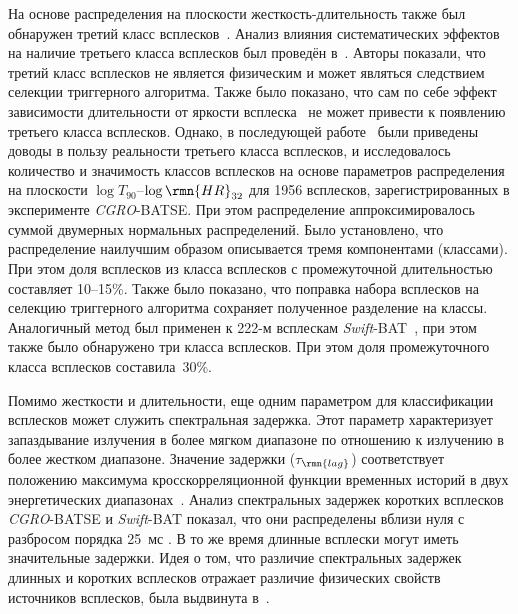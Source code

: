 На основе распределения на плоскости жесткость-длительность также был обнаружен 
третий класс всплесков~\citep{Mukherjee_1998, Hakkila_2000}. Анализ влияния 
систематических эффектов на наличие третьего класса всплесков был проведён 
в~\citep{Hakkila_2003}. Авторы показали, что третий класс всплесков не является 
физическим и может являться следствием селекции триггерного алгоритма. Также было 
показано, что сам по себе эффект зависимости длительности от яркости 
всплеска~\citep{Bonnell_1997} не может привести к появлению третьего класса всплесков. 
Однако, в последующей работе~\citep{Horvath_2006} были приведены доводы в пользу 
реальности третьего класса всплесков, и исследовалось количество и значимость 
классов всплесков на основе параметров распределения на плоскости 
$\log T_{90}$--$\log \rmn{HR}_{32}$ для 1956 всплесков, зарегистрированных 
в эксперименте \textit{CGRO}-BATSE. При этом распределение аппроксимировалось 
суммой двумерных нормальных распределений. Было установлено, что распределение 
наилучшим образом описывается тремя компонентами (классами). При этом доля всплесков 
из класса всплесков с промежуточной длительностью составляет 10--15\%. Также было показано, что поправка набора 
всплесков на селекцию триггерного алгоритма сохраняет полученное разделение на классы. 
Аналогичный метод был применен к 222-м всплескам \textit{Swift}-BAT~\citep{Horvath_2010}, 
при этом также было обнаружено три класса всплесков. При этом доля промежуточного 
класса всплесков составила~30\%.

Помимо жесткости и длительности, еще одним параметром для классификации всплесков 
может служить спектральная задержка. Этот параметр характеризует запаздывание 
излучения в более мягком диапазоне по отношению к излучению в более жестком диапазоне. 
Значение задержки ($\tau_\rmn{lag}$) соответствует положению  максимума 
кросскорреляционной функции временных историй в двух энергетических диапазонах~\citep{Norris_2000}. 
Анализ спектральных задержек коротких всплесков \textit{CGRO}-BATSE и 
\textit{Swift}-BAT показал, что они распределены вблизи нуля с разбросом 
порядка 25~мс \citep{Norris_and_Bonnel_2006, Norris_2011ApJ}. В то же время длинные 
всплески могут иметь значительные задержки. Идея о том, что различие спектральных 
задержек длинных и коротких всплесков отражает различие физических свойств источников 
всплесков, была выдвинута в~\citep{Gehrels_2006_Nature}.


